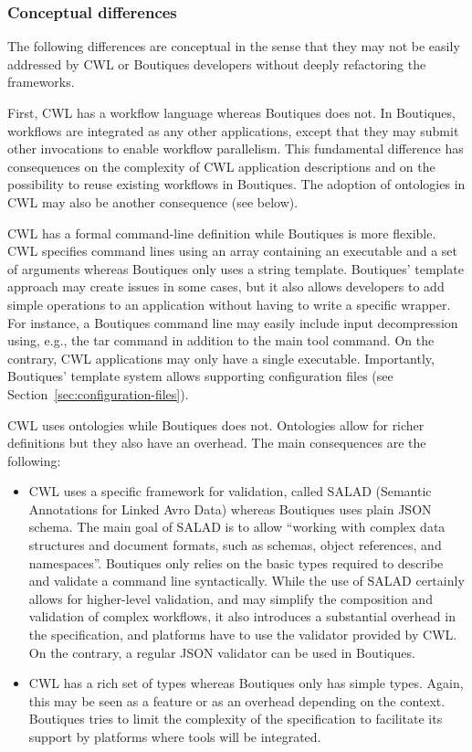 \documentclass{article}
\newcommand{\boutiques}{Boutiques\xspace}
\begin{document}
\subsubsection{Conceptual differences}

The following differences are conceptual in the sense that they may
not be easily addressed by CWL or \boutiques developers without deeply
refactoring the frameworks.

First, CWL has a workflow language whereas \boutiques does not. In
\boutiques, workflows are integrated as any other applications, except
that they may submit other invocations to enable workflow
parallelism. This fundamental difference has consequences on the
complexity of CWL application descriptions and on the possibility to
reuse existing workflows in \boutiques. The adoption of ontologies in
CWL may also be another consequence (see below).

CWL has a formal command-line definition while \boutiques is more
flexible. CWL specifies command lines using an array containing an
executable and a set of arguments whereas \boutiques only uses a
string template. \boutiques' template approach may create issues in
some cases, but it also allows developers to add simple operations to
an application without having to write a specific wrapper. For
instance, a \boutiques command line may easily include input
decompression using, e.g., the tar command in addition to the main
tool command. On the contrary, CWL applications may only have a single
executable. Importantly, \boutiques' template system allows supporting
configuration files (see Section~\ref{sec:configuration-files}).

CWL uses ontologies while \boutiques does not. Ontologies allow for
richer definitions but they also have an overhead. The main
consequences are the following:
\begin{itemize}
\item CWL uses a specific framework for
validation, called SALAD (Semantic Annotations for Linked Avro Data)
whereas \boutiques uses plain JSON schema. The main goal of SALAD is to
allow ``working with complex data structures and document formats, such
as schemas, object references, and namespaces''. \boutiques only relies
on the basic types required to describe and validate a command line
syntactically. While the use of SALAD certainly allows for
higher-level validation, and may simplify the composition and
validation of complex workflows, it also introduces a substantial
overhead in the specification, and platforms have to use the validator
provided by CWL. On the contrary, a regular JSON validator can be used in \boutiques.
\item  CWL has a rich set of types whereas \boutiques only has simple
types. Again, this may be seen as a feature or as an overhead
depending on the context. \boutiques tries to limit the complexity of
the specification to facilitate its support by platforms where tools
will be integrated.
\end{itemize}
\end{document}
